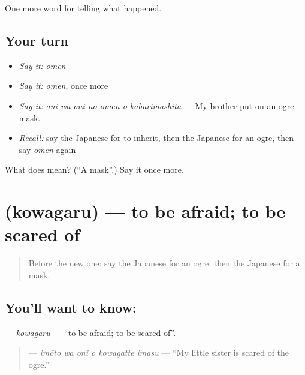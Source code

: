 \begin{grammarlens}[title={What you've built}]
One more word for telling what happened.
\end{grammarlens}

\subsection*{Your turn}
\begin{itemize}
\raggedright
  \item \emph{Say it:} \emph{omen}
  \item \emph{Say it:} \emph{omen}, once more
  \item \emph{Say it:} \emph{ani wa oni no omen o kaburimashita} — My brother put on an ogre mask.
  \item \emph{Recall:} say the Japanese for to inherit, then the Japanese for an ogre, then say \emph{omen} again
\end{itemize}

\begin{tcolorbox}[breakable,colback=teal!4,colframe=teal!35!black,title={Before you move on}]
What does  mean? (\textquotedblleft{}A mask\textquotedblright{}.) Say it once more.
\end{tcolorbox}
\section[\texorpdfstring{\ja{こわがる} (kowagaru)}{こわがる (kowagaru)}]{ (kowagaru) — to be afraid; to be scared of}

\label{lesson:JA-C297-kowagaru}



\begin{quote}
Before the new one: say the Japanese for an ogre, then the Japanese for a mask.
\end{quote}

\subsection*{You'll want to know: }
\textbf{} — \emph{kowagaru} — \textquotedblleft{}to be afraid; to be scared of\textquotedblright{}.

\begin{quote}
\textbf{  } — \emph{imōto wa oni o kowagatte imasu} — \textquotedblleft{}My little sister is scared of the ogre.\textquotedblright{}
\end{quote}

